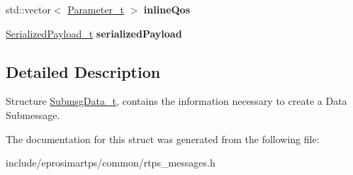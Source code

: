 \begin{DoxyCompactItemize}
\item 
\hypertarget{structeprosima_1_1rtps_1_1_submsg_data__t_a4c44ab16e614637f0f9ce282b3a6d8e9}{std\-::vector$<$ \hyperlink{structeprosima_1_1rtps_1_1_parameter__t}{\-Parameter\-\_\-t} $>$ {\bfseries inline\-Qos}}\label{structeprosima_1_1rtps_1_1_submsg_data__t_a4c44ab16e614637f0f9ce282b3a6d8e9}

\item 
\hypertarget{structeprosima_1_1rtps_1_1_submsg_data__t_a790504a11794e921ba74187ba2c4b0f9}{\hyperlink{structeprosima_1_1rtps_1_1_serialized_payload__t}{\-Serialized\-Payload\-\_\-t} {\bfseries serialized\-Payload}}\label{structeprosima_1_1rtps_1_1_submsg_data__t_a790504a11794e921ba74187ba2c4b0f9}

\end{DoxyCompactItemize}


\subsection{\-Detailed \-Description}
\-Structure \hyperlink{structeprosima_1_1rtps_1_1_submsg_data__t}{\-Submsg\-Data\-\_\-t}, contains the information necessary to create a \-Data \-Submessage. 

\-The documentation for this struct was generated from the following file\-:\begin{DoxyCompactItemize}
\item 
include/eprosimartps/common/rtps\-\_\-messages.\-h\end{DoxyCompactItemize}
